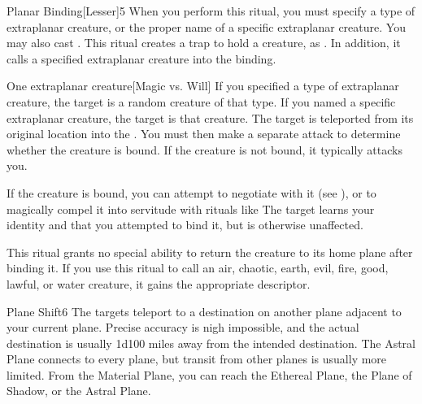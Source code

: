\begin{spellsection}{Planar Binding}[Lesser]{5}
\spellspecial When you perform this ritual, you must specify a type of extraplanar creature, or the proper name of a specific extraplanar creature. You may also cast .
\spellline
\spelleffect This ritual creates a trap to hold a creature, as . In addition, it calls a specified extraplanar creature into the binding.
\begin{spelltarget}{One extraplanar creature}[Magic vs. Will]
    \spellspecial If you specified a type of extraplanar creature, the target is a random creature of that type. If you named a specific extraplanar creature, the target is that creature.
    \spellsuccess The target is teleported from its original location into the . You must then make a separate attack to determine whether the creature is bound. If the creature is not bound, it typically attacks you.

    If the creature is bound, you can attempt to negotiate with it (see ), or to magically compel it into servitude with rituals like 
    \spellfailure The target learns your identity and that you attempted to bind it, but is otherwise unaffected.
\end{spelltarget}
\spellnotes This ritual grants no special ability to return the creature to its home plane after binding it. If you use this ritual to call an air, chaotic, earth, evil, fire, good, lawful, or water creature, it gains the appropriate descriptor.
\end{spellsection}

\begin{spellsection}{Plane Shift}{6}
\spelleffect The targets teleport to a destination on another plane adjacent to your current plane. Precise accuracy is nigh impossible, and the actual destination is usually 1d100 miles away from the intended destination.
\spellnotes The Astral Plane connects to every plane, but transit from other planes is usually more limited. From the Material Plane, you can reach the Ethereal Plane, the Plane of Shadow, or the Astral Plane.
\end{spellsection}

